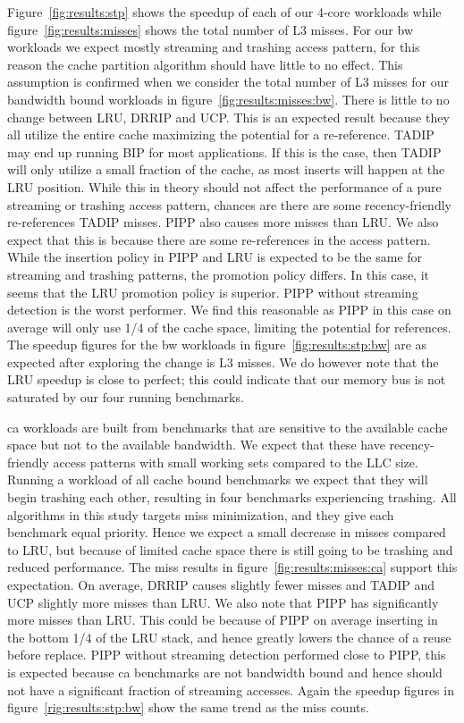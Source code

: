 Figure~\ref{fig:results:stp} shows the speedup of each of our 4-core workloads while figure~\ref{fig:results:misses} shows the total number of L3 misses.
For our bw workloads we expect mostly streaming and trashing access pattern, for this reason the cache partition algorithm should have little to no effect.
This assumption is confirmed when we consider the total number of L3 misses for our bandwidth bound workloads in figure~\ref{fig:results:misses:bw}.
There is little to no change between LRU, DRRIP and UCP. 
This is an expected result because they all utilize the entire cache maximizing the potential for a re-reference.
TADIP may end up running BIP for most applications. 
If this is the case, then TADIP will only utilize a small fraction of the cache, as most inserts will happen at the LRU position.
While this in theory should not affect the performance of a pure streaming or trashing access pattern, chances are there are some recency-friendly re-references TADIP misses.
PIPP also causes more misses than LRU.
We also expect that this is because there are some re-references in the access pattern. 
While the insertion policy in PIPP and LRU is expected to be the same for streaming and trashing patterns, the promotion policy differs. 
In this case, it seems that the LRU promotion policy is superior.
PIPP without streaming detection is the worst performer.
We find this reasonable as PIPP in this case on average will only use 1/4 of the cache space, limiting the potential for references.
The speedup figures for the bw workloads in figure~\ref{fig:results:stp:bw} are as expected after exploring the change is L3 misses.
We do however note that the LRU speedup is close to perfect; this could indicate that our memory bus is not saturated by our four running benchmarks.

ca workloads are built from benchmarks that are sensitive to the available cache space but not to the available bandwidth.
We expect that these have recency-friendly access patterns with small working sets compared to the LLC size.
Running a workload of all cache bound benchmarks we expect that they will begin trashing each other, resulting in four benchmarks experiencing trashing.
All algorithms in this study targets miss minimization, and they give each benchmark equal priority.
Hence we expect a small decrease in misses compared to LRU, but because of limited cache space there is still going to be trashing and reduced performance.
The miss results in figure~\ref{fig:results:misses:ca} support this expectation.
On average, DRRIP causes slightly fewer misses and TADIP and UCP slightly more misses than LRU.
We also note  that PIPP has significantly more misses than LRU.
This could be because of PIPP on average inserting in the bottom 1/4 of the LRU stack, and hence greatly lowers the chance of a reuse before replace.
PIPP without streaming detection performed close to PIPP, this is expected because ca benchmarks are not bandwidth bound and hence should not have a significant fraction of streaming accesses.
Again the speedup figures in figure~\ref{rig:results:stp:bw} show the same trend as the miss counts.

